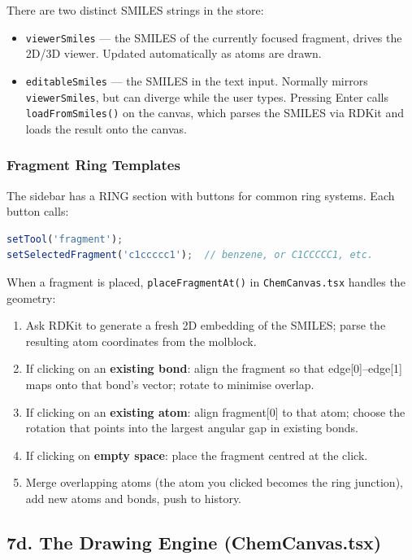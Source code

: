 \documentclass[11pt,a4paper]{article}
\begin{document}
There are two distinct SMILES strings in the store:
\begin{itemize}[leftmargin=1.5em]
  \item \lstinline|viewerSmiles| --- the SMILES of the currently focused fragment,
        drives the 2D/3D viewer. Updated automatically as atoms are drawn.
  \item \lstinline|editableSmiles| --- the SMILES in the text input. Normally mirrors
        \lstinline|viewerSmiles|, but can diverge while the user types. Pressing Enter
        calls \lstinline|loadFromSmiles()| on the canvas, which parses the SMILES via
        RDKit and loads the result onto the canvas.
\end{itemize}

\subsubsection{Fragment Ring Templates}

The sidebar has a RING section with buttons for common ring systems. Each button calls:
\begin{lstlisting}[language=TypeScript]
setTool('fragment');
setSelectedFragment('c1ccccc1');  // benzene, or C1CCCCC1, etc.
\end{lstlisting}

When a fragment is placed, \lstinline|placeFragmentAt()| in \lstinline|ChemCanvas.tsx|
handles the geometry:
\begin{enumerate}[leftmargin=1.5em]
  \item Ask RDKit to generate a fresh 2D embedding of the SMILES;
        parse the resulting atom coordinates from the molblock.
  \item If clicking on an \textbf{existing bond}: align the fragment so that
        edge[0]--edge[1] maps onto that bond's vector; rotate to minimise overlap.
  \item If clicking on an \textbf{existing atom}: align fragment[0] to that atom;
        choose the rotation that points into the largest angular gap in existing bonds.
  \item If clicking on \textbf{empty space}: place the fragment centred at the click.
  \item Merge overlapping atoms (the atom you clicked becomes the ring junction),
        add new atoms and bonds, push to history.
\end{enumerate}

\subsection{7d. The Drawing Engine (ChemCanvas.tsx)}
\end{document}
